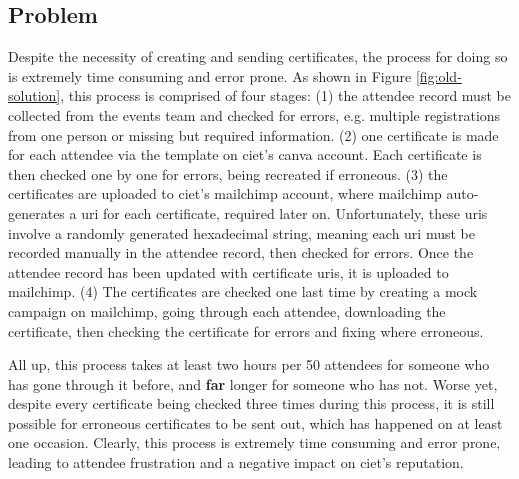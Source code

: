 \documentclass[11pt]{article}
\begin{document}
\subsection{Problem}

Despite the necessity of creating and sending certificates, the process for doing so is extremely time consuming and error prone. As shown in Figure \ref{fig:old-solution}, this process is comprised of four stages: (1) the attendee record must be collected from the events team and checked for errors, e.g. multiple registrations from one person or missing but required information. (2) one certificate is made for each attendee via the template on \acrshort{ciet}'s \Gls{canva} account. Each certificate is then checked one by one for errors, being recreated if erroneous. (3) the certificates are uploaded to \acrshort{ciet}'s \Gls{mailchimp} account, where \Gls{mailchimp} auto-generates a \acrshort{uri} for each certificate, required later on. Unfortunately, these \acrshort{uri}s involve a randomly generated hexadecimal string, meaning each \acrshort{uri} must be recorded manually in the attendee record, then checked for errors. Once the attendee record has been updated with certificate \acrshort{uri}s, it is uploaded to \Gls{mailchimp}. (4) The certificates are checked one last time by creating a mock campaign on \Gls{mailchimp}, going through each attendee, downloading the certificate, then checking the certificate for errors and fixing where erroneous.

All up, this process takes at least two hours per 50 attendees for someone who has gone through it before, and \textbf{far} longer for someone who has not. Worse yet, despite every certificate being checked three times during this process, it is still possible for erroneous certificates to be sent out, which has happened on at least one occasion. Clearly, this process is extremely time consuming and error prone, leading to attendee frustration and a negative impact on \acrshort{ciet}'s reputation.

\newpage
\end{document}
